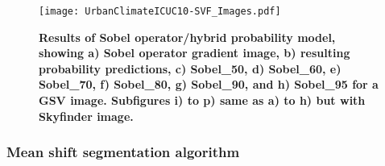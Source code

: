\documentclass[final,3p,times,authoryear]{elsarticle}
\begin{document}



	

\begin{figure}
\centering    
\texttt{[image: UrbanClimateICUC10-SVF\_Images.pdf]}
\caption{\bf Results of Sobel operator/hybrid probability model, showing a) Sobel operator gradient image, b) resulting probability predictions, c) Sobel\_50, d) Sobel\_60, e) Sobel\_70, f) Sobel\_80, g) Sobel\_90, and h) Sobel\_95 for a GSV image. Subfigures i) to p) same as a) to h) but with Skyfinder image.}    
 \label{fig:sobolresults}  
\end{figure} 

\subsubsection{Mean shift segmentation algorithm}\label{sec:mean}
\end{document}
